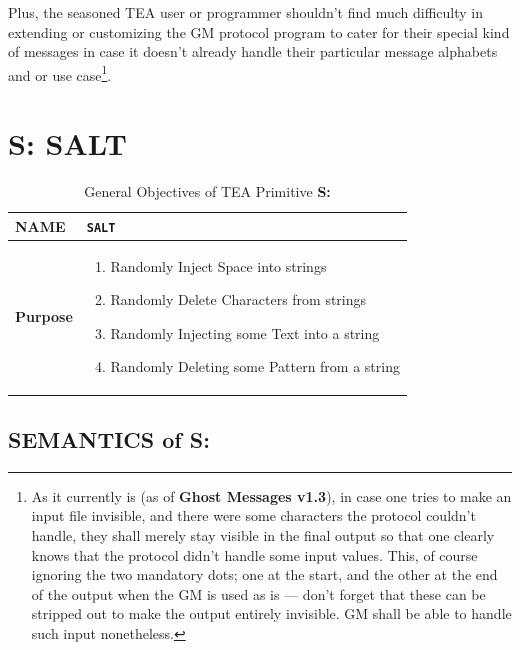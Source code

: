 \documentclass[a4paper, 18pt]{book} %
\begin{document}
{{{\vspace{2em}

Plus, the seasoned TEA user or programmer shouldn't find much difficulty in extending or customizing the GM protocol program to cater for their special kind of messages in case it doesn't already handle their particular message alphabets and or use case\footnote{As it currently is (as of \textbf{Ghost Messages v1.3}), in case one tries to make an input file invisible, and there were some characters the protocol couldn't handle, they shall merely stay visible in the final output so that one clearly knows that the protocol didn't handle some input values. This, of course ignoring the two mandatory dots; one at the start, and the other at the end of the output when the GM is used as is --- don't forget that these can be stripped out to make the output entirely invisible. GM shall be able to handle such input nonetheless.}.


 
\chapter{S: SALT}
\label{CHAPS}


\begin{table}[H]
  \centering
  \LARGE
	\begin{tabular}[t]{|p{}|p{}}
 
	\textbf{NAME} & \texttt{SALT}\\
	\hline
	\textbf{Purpose} & \begin{enumerate}
	\item Randomly Inject Space into strings
	\item Randomly Delete Characters from strings
	\item Randomly Injecting some Text into a string
	\item Randomly Deleting some Pattern from a string
	\end{enumerate}\\
	\hline
	              
\end{tabular}
\caption{General Objectives of TEA Primitive \textbf{S:}}
  \label{TABTAZS}
\end{table}


\section{SEMANTICS of S:}
\label{SECSEMS}


}}}
\end{document}

